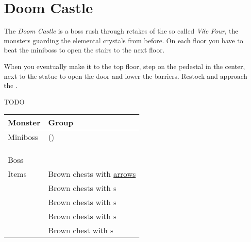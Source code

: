 \section{Doom Castle}
\label{map:doom_castle}


The \textit{Doom Castle} is a boss rush through retakes of the so called \textit{Vile Four}, the monsters guarding the elemental crystals from before. On each floor you have to beat the miniboss to open the stairs to the next floor. 

When you eventually make it to the top floor, step on the pedestal in the center, next to the statue to open the door and lower the barriers. Restock and approach the .

TODO


\noindent\begin{tabularx}{\textwidth}[l]{lX}
	Monster & Group
\\ \hline
	Miniboss
	& (\nameref{monster:skullrus_rex}) \\
	& \nameref{monster:stone_golem} \\
	& \nameref{monster:twinhead_wyvern} \\
	& \nameref{monster:zuh}
\\ \hline
	Boss & \nameref{monster:dark_king}
\\ \hline
	Items
	& Brown chests with \hyperref[weapon:bow_of_grace]{arrows} \\
	& Brown chests with \nameref{item:cure_potion}s \\
	& Brown chests with \nameref{item:heal_potion}s \\
	& Brown chests with \nameref{item:seed}s \\
	& Brown chest with \nameref{item:refresher}s \\
\end{tabularx}
